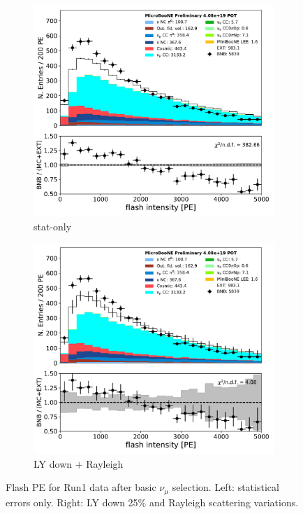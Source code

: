 \documentclass[a4paper]{article}
\begin{document}
\begin{figure}[H] 
\begin{center}
    \begin{subfigure}[b]{0.4\textwidth}
    \centering
    \includegraphics[width=1.00\textwidth]{detsys/datamc/flash_pe_03292020_statonly.pdf}
    \caption{\label{fig:detsys:datamc:flashpe:run1:stat} stat-only}
    \end{subfigure}
    \begin{subfigure}[b]{0.4\textwidth}
    \centering
    \includegraphics[width=1.00\textwidth]{detsys/datamc/flash_pe_03292020_detsys.pdf}
    \caption{\label{fig:detsys:datamc:flashpe:run1:syst}LY down $+$ Rayleigh}
    \end{subfigure}
\caption{\label{fig:detsys:datamc:flashpe:run1}Flash PE for Run1 data after basic $\nu_{\mu}$ selection. Left: statistical errors only. Right: LY down 25\% and Rayleigh scattering variations.}
\end{center}
\end{figure}
\end{document}

